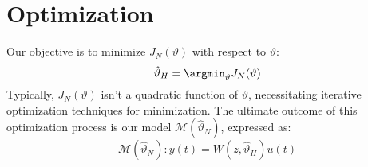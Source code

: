 \section{Optimization}

Our objective is to minimize $J_N(\vartheta)$ with respect to $\vartheta$:
\[\hat{\vartheta}_H=\argmin_{\vartheta}J_N(\vartheta)\]
Typically, $J_N(\vartheta)$ isn't a quadratic function of $\vartheta$, necessitating iterative optimization techniques for minimization.
The ultimate outcome of this optimization process is our model $\mathcal{M}(\hat{\vartheta}_N)$, expressed as:
\[\mathcal{M}(\hat{\vartheta}_N):y(t)=W(z,\hat{\vartheta}_H)u(t)\]
